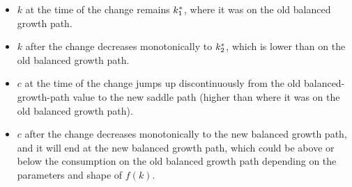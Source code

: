 \documentclass[12pt]{article}
\begin{document}
\newpage{}

\begin{itemize}
    \item $k$ at the time of the change remains $k^*_1$, where it was on the old balanced growth path.
    \item $k$ after the change decreases monotonically to $k^*_2$, which is lower than on the old balanced growth path.
    \item $c$ at the time of the change jumps up discontinuously from the old balanced-growth-path value to the new saddle path (higher than where it was on the old balanced growth path).
    \item $c$ after the change decreases monotonically to the new balanced growth path, and it will end at the new balanced growth path, which could be above or below the consumption on the old balanced growth path depending on the parameters and shape of $f(k)$.
\end{itemize}

\newpage{}
\end{document}
